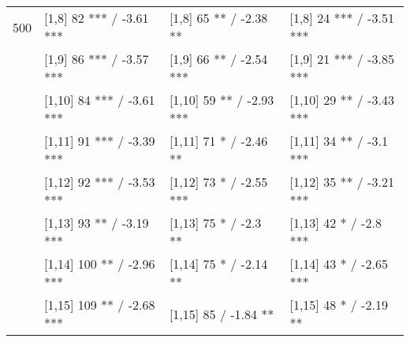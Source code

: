 \begin{table}
\begin{tabular}[t]{llll}
500 & {}[1,8] 82 *** / -3.61 *** & {}[1,8] 65 ** / -2.38 ** & {}[1,8] 24 *** / -3.51 ***\\
 & {}[1,9] 86 *** / -3.57 *** & {}[1,9] 66 ** / -2.54 *** & {}[1,9] 21 *** / -3.85 ***\\
 & {}[1,10] 84 *** / -3.61 *** & {}[1,10] 59 ** / -2.93 *** & {}[1,10] 29 ** / -3.43 ***\\
 & {}[1,11] 91 *** / -3.39 *** & {}[1,11] 71 * / -2.46 ** & {}[1,11] 34 ** / -3.1 ***\\
 & {}[1,12] 92 *** / -3.53 *** & {}[1,12] 73 * / -2.55 *** & {}[1,12] 35 ** / -3.21 ***\\
\addlinespace
 & {}[1,13] 93 ** / -3.19 *** & {}[1,13] 75 * / -2.3 ** & {}[1,13] 42 * / -2.8 ***\\
 & {}[1,14] 100 ** / -2.96 *** & {}[1,14] 75 * / -2.14 ** & {}[1,14] 43 * / -2.65 ***\\
 & {}[1,15] 109 ** / -2.68 *** & {}[1,15] 85  / -1.84 ** & {}[1,15] 48 * / -2.19 **\\
\bottomrule
\end{tabular}
\end{table}
